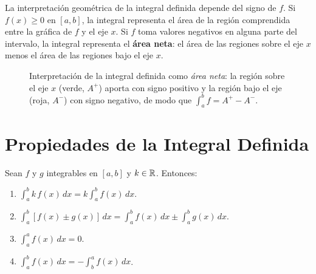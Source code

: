 \begin{rem}
La interpretación geométrica de la integral definida depende del signo de $f$. Si $f(x)\geq 0$ en $[a,b]$, la integral representa el área de la región comprendida entre la gráfica de $f$ y el eje $x$. Si $f$ toma valores negativos en alguna parte del intervalo, la integral representa el \textbf{área neta}: el área de las regiones sobre el eje $x$ menos el área de las regiones bajo el eje $x$.
\end{rem}

\begin{figure}[!htbp]
\centering
{}
\caption{Interpretación de la integral definida como \emph{área neta}: la
región sobre el eje $x$ (verde, $A^+$) aporta con signo positivo y la región
bajo el eje (roja, $A^-$) con signo negativo, de modo que
$\int_a^b f = A^+ - A^-$.}
\label{fig:area_neta}
\end{figure}

\section{Propiedades de la Integral Definida}

\begin{theorem}
Sean $f$ y $g$ integrables en $[a,b]$ y $k \in {\mathbb R}$. Entonces:
\begin{enumerate}
    \item $\displaystyle\int_{a}^{b} k\,f(x)\,dx = k\int_{a}^{b} f(x)\,dx$.
    \item $\displaystyle\int_{a}^{b} [f(x) \pm g(x)]\,dx = \int_{a}^{b} f(x)\,dx \pm \int_{a}^{b} g(x)\,dx$.
    \item $\displaystyle\int_{a}^{a} f(x)\,dx = 0$.
    \item $\displaystyle\int_{a}^{b} f(x)\,dx = -\int_{b}^{a} f(x)\,dx$.
\end{enumerate}
\end{theorem}

